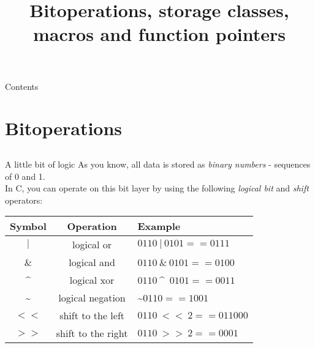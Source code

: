 
\newcommand{\topic}{
	Bitoperations, storage classes, macros and function pointers
}

\title{\topic}
\supertitle{\course}
\date{}



\maketitle

\begin{frame}{Contents}
	\tableofcontents
\end{frame}

\section{Bitoperations}
\subsection{}

\begin{frame}{A little bit of logic}
	As you know, all data is stored as \textit{binary numbers} - sequences of 0 and 1.\\
	In C, you can operate on this bit layer by using the following \textit{logical bit} and \textit{shift} operators:\bigskip
	
	\begin{tabular}{|c|c|l|}
																						  	  \hline
		\textbf{Symbol} 	& \textbf{Operation} 	& \textbf{Example} 							\\\hline
		$|$					& logical or				& $0110\ |\ 0101 == 0111$ 		\\\hline
		$\&$ 				& logical and 				& $0110\ \&\ 0101 == 0100$ 	\\\hline
		\textasciicircum				& logical xor 				& $0110\ $\textasciicircum\ $0101 == 0011$ 	\\\hline
		\textasciitilde			& logical negation 			& \textasciitilde $0110 == 1001$	\\\hline
		$<<$ 			& shift to the left 			& $0110\ <<\ 2 == 011000$ 	\\\hline
		$>>$ 		& shift to the right 				& $0110\ >>\ 2 == 0001$ 			\\\hline
	\end{tabular}
	
\end{frame}

